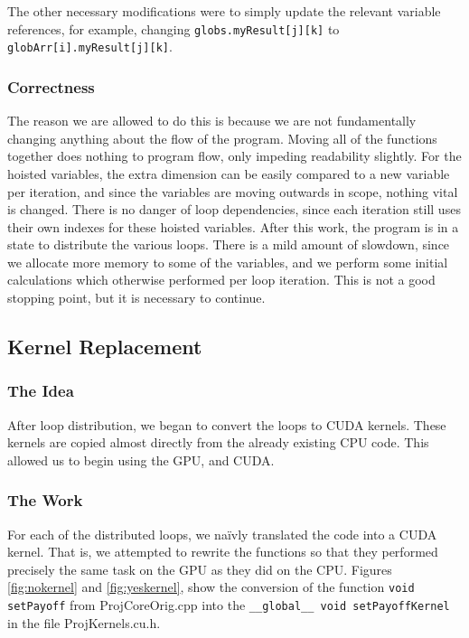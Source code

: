 \documentclass[]{report}
\begin{document}
The other necessary modifications were to simply update the relevant variable references, for example, changing \texttt{globs.myResult[j][k]} to\\ \texttt{globArr[i].myResult[j][k]}.
\subsubsection{Correctness}
The reason we are allowed to do this is because we are not fundamentally changing anything about the flow of the program. Moving all of the functions together does nothing to program flow, only impeding readability slightly. For the hoisted variables, the extra dimension can be easily compared to a new variable per iteration, and since the variables are moving outwards in scope, nothing vital is changed. There is no danger of loop dependencies, since each iteration still uses their own indexes for these hoisted variables.
After this work, the program is in a state to distribute the various loops. There is a mild amount of slowdown, since we allocate more memory to some of the variables, and we perform some initial calculations which otherwise performed per loop iteration. This is not a good stopping point, but it is necessary to continue.
\subsection{Kernel Replacement}
\subsubsection{The Idea}
After loop distribution, we began to convert the loops to CUDA kernels. These kernels are copied almost directly from the already existing CPU code. This allowed us to begin using the GPU, and CUDA.
\subsubsection{The Work}
For each of the distributed loops, we na\"ivly translated the code into a CUDA kernel. That is, we attempted to rewrite the functions so that they performed precisely the same task on the GPU as they did on the CPU. Figures \ref{fig:nokernel} and \ref{fig:yeskernel}, show the conversion of the function \texttt{void setPayoff} from ProjCoreOrig.cpp into the \texttt{\_\_global\_\_ void setPayoffKernel} in the file ProjKernels.cu.h.
\end{document}
